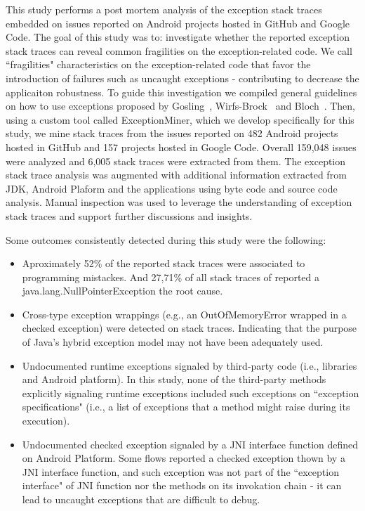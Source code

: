 \documentclass[conference]{IEEEtran}
\begin{document}
This study performs a post mortem analysis of the exception stack traces embedded on issues
reported on Android projects hosted in GitHub and Google Code. 
The goal of this study was to: investigate whether the reported exception stack traces
 can reveal common fragilities on the exception-related code.  
We call ``fragilities" characteristics on the exception-related code 
that favor the introduction of failures such as uncaught 
exceptions -  contributing to decrease the applicaiton robustness.
To guide this investigation we compiled general guidelines on how to use
exceptions proposed by Gosling~\cite{gosling2000java},
Wirfs-Brock~\cite{wirfs2006toward} and Bloch~\cite{bloch2008effective}.
Then, using a custom tool called ExceptionMiner,
 which we develop specifically for this study, we mine stack traces from the issues reported 
on 482 Android projects hosted in GitHub and 157 projects hosted in Google Code.
Overall 159,048 issues were analyzed and 6,005 stack traces were extracted from them.
The exception stack trace analysis was augmented with additional information
extracted from JDK, Android Plaform and the applications using byte code 
and source code analysis. Manual inspection was used to leverage the understanding 
of exception stack traces and support further discussions and insights.

Some outcomes consistently detected during this study were the following:

\begin{itemize}

       \item Aproximately 52\% of the reported stack traces were associated to programming mistackes. 
And 27,71\% of all stack traces of reported a java.lang.NullPointerException the root cause.

     \item  Cross-type exception wrappings (e.g., an OutOfMemoryError wrapped in a checked exception)
were detected on stack traces. Indicating that the purpose of Java's hybrid exception model may not have been adequately used.

   \item Undocumented runtime exceptions signaled by third-party code (i.e., libraries and Android platform). 
    In this study, none of the third-party methods explicitly signaling runtime exceptions included such exceptions
    on ``exception specifications" (i.e., a list of exceptions that a method might raise during its execution). 

   \item Undocumented checked exception signaled by a  JNI interface function defined on Android Platform. 
    Some flows reported a checked exception thown by a JNI interface function, and  such exception was not  
    part of the ``exception interface" of JNI function nor the methods on its invokation chain - it can lead to 
   uncaught exceptions that are difficult to debug. 

\end{itemize}
\end{document}
